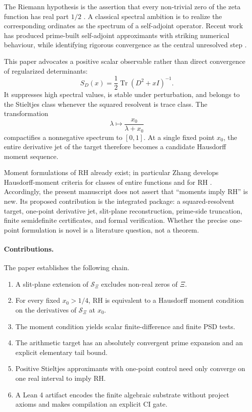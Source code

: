 \documentclass[11pt]{article}
\theoremstyle{definition}
\newcommand{\XiR}{\mathcal S_{\Xi}}
\newcommand{\Tr}{\operatorname{Tr}}
\begin{document}
The Riemann hypothesis is the assertion that every non-trivial zero of the zeta
function has real part $1/2$ \cite{Riemann1859,Titchmarsh1986,ClayRH}. A classical
spectral ambition is to realize the corresponding ordinates as the spectrum of a
self-adjoint operator. Recent work has produced prime-built self-adjoint approximants
with striking numerical behaviour, while identifying rigorous convergence as the
central unresolved step \cite{ConnesConsaniMoscovici2025,ConnesVanSuijlekom2025}.

This paper advocates a positive scalar observable rather than direct convergence of
regularized determinants:
\[
 S_D(x)=\frac12\Tr(D^2+xI)^{-1}.
\]
It suppresses high spectral values, is stable under perturbation, and belongs to the
Stieltjes class whenever the squared resolvent is trace class. The transformation
\[
 \lambda\longmapsto \frac{x_0}{\lambda+x_0}
\]
compactifies a nonnegative spectrum to $[0,1]$. At a single fixed point $x_0$, the
entire derivative jet of the target therefore becomes a candidate Hausdorff moment
sequence.

Moment formulations of RH already exist; in particular Zhang develops Hausdorff-moment
criteria for classes of entire functions and for RH \cite{Zhang2023}. Accordingly, the
present manuscript does not assert that ``moments imply RH'' is new. Its proposed
contribution is the integrated package: a squared-resolvent target, one-point derivative
jet, slit-plane reconstruction, prime-side truncation, finite semidefinite certificates,
and formal verification. Whether the precise one-point formulation is novel is a
literature question, not a theorem.

\paragraph{Contributions.}
The paper establishes the following chain.
\begin{enumerate}[label=(\roman*)]
  \item A slit-plane extension of $\XiR$ excludes non-real zeros of $\Xi$.
  \item For every fixed $x_0>1/4$, RH is equivalent to a Hausdorff moment condition on
  the derivatives of $\XiR$ at $x_0$.
  \item The moment condition yields scalar finite-difference and finite PSD tests.
  \item The arithmetic target has an absolutely convergent prime expansion and an
  explicit elementary tail bound.
  \item Positive Stieltjes approximants with one-point control need only converge on one
  real interval to imply RH.
  \item A Lean 4 artifact encodes the finite algebraic substrate without project axioms and makes compilation an explicit CI gate.
\end{enumerate}
\end{document}
